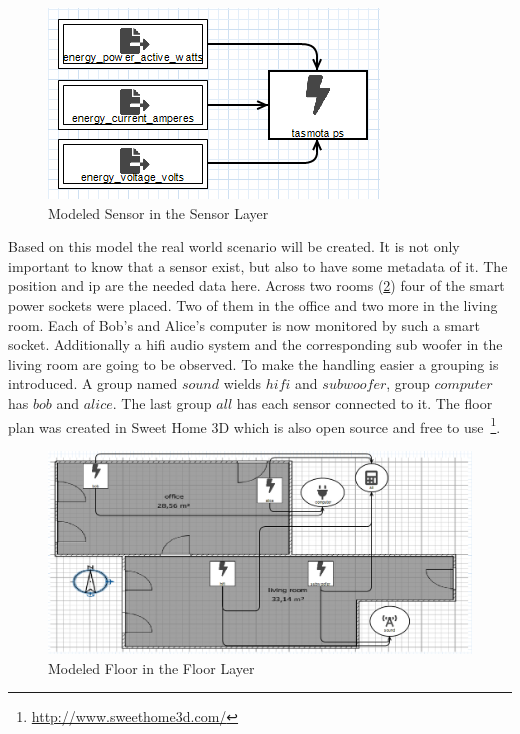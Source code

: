 \begin{figure}[!ht]
	\centering
	\includegraphics[width=.7\linewidth]{assets/images/sensorLayer}
	\caption{Modeled Sensor in the Sensor Layer}
	\label{fig:modeled_sensor_layer}
\end{figure}

Based on this model the real world scenario will be created. It is not only important to know that a sensor exist, but also to have some metadata of it. The position and ip are the needed data here. Across two rooms (\cref{fig:modeled_floor_layer}) four of the smart power sockets were placed. Two of them in the office and two more in the living room. Each of Bob's and Alice's computer is now monitored by such a smart socket. Additionally a \gls{hifi} audio system and the corresponding sub woofer in the living room are going to be observed. To make the handling easier a grouping is introduced. A group named $sound$ wields $hifi$ and $subwoofer$, group $computer$ has $bob$ and $alice$. The last group $all$ has each sensor connected to it. The floor plan was created in Sweet Home 3D which is also open source and free to use~\footnote{\url{http://www.sweethome3d.com/}}. 

\begin{figure}[!ht]
	\centering
	\includegraphics[width=\linewidth]{assets/images/floorLayer}
	\caption{Modeled Floor in the Floor Layer}
	\label{fig:modeled_floor_layer}
\end{figure}

